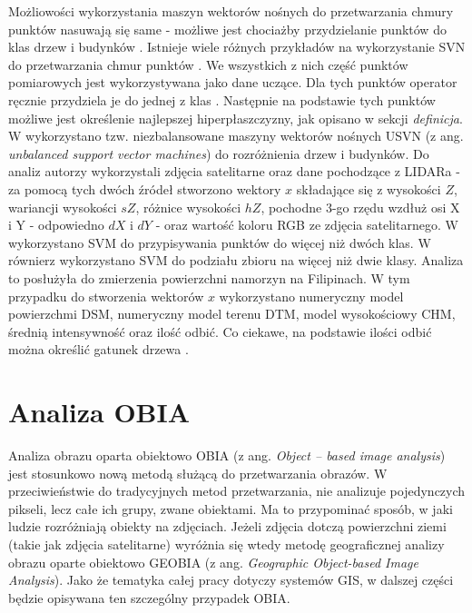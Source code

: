 Możliowości wykorzystania maszyn wektorów nośnych do przetwarzania chmury punktów nasuwają się same - możliwe jest chociażby przydzielanie punktów do klas drzew i budynków \cite{xwang2011}. Istnieje wiele 
różnych przykładów na wykorzystanie SVN do przetwarzania chmur punktów \cite{xwang2011,li2013,david2015}. We wszystkich z nich część punktów pomiarowych jest wykorzystywana jako dane uczące.
Dla tych punktów operator ręcznie przydziela je do jednej z klas \cite{xwang2011}. Następnie na podstawie tych punktów możliwe jest określenie najlepszej hiperpłaszczyzny, jak opisano w sekcji \textit{definicja}.
W \cite{xwang2011} wykorzystano tzw. niezbalansowane maszyny wektorów nośnych USVN (z ang. \textit{unbalanced support vector machines}) do rozróżnienia drzew i budynków.
Do analiz autorzy wykorzystali zdjęcia satelitarne oraz dane pochodzące z LIDARa - za pomocą tych dwóch źródeł stworzono wektory $x$
składające się z wysokości $Z$, wariancji wysokości $sZ$, różnice wysokości $hZ$,
pochodne 3-go rzędu wzdłuż osi X i Y - odpowiedno $dX$ i $dY$ - oraz wartość koloru RGB ze zdjęcia satelitarnego. 
W \cite{li2013} wykorzystano SVM do przypisywania punktów do więcej niż dwóch klas. 
W \cite{david2015} równierz wykorzystano SVM do podziału zbioru na więcej niż dwie klasy. Analiza to posłużyła do zmierzenia powierzchni namorzyn na Filipinach. 
W tym przypadku do stworzenia wektorów $x$ wykorzystano numeryczny model powierzchmi DSM, numeryczny model terenu DTM, model wysokościowy CHM, średnią intensywność oraz ilość odbić. Co ciekawe, na podstawie
ilości odbić można określić gatunek drzewa \cite{Sasaki2012}.

\section{Analiza OBIA}

Analiza obrazu oparta obiektowo OBIA (z ang. \textit{Object – based image analysis}) jest stosunkowo nową metodą \cite{burnett2003} służącą do przetwarzania obrazów. W przeciwieństwie do tradycyjnych metod przetwarzania, 
nie analizuje pojedynczych pikseli, lecz całe ich grupy, zwane obiektami. Ma to przypominać sposób, w jaki ludzie rozróżniają obiekty na zdjęciach. Jeżeli zdjęcia dotczą powierzchni ziemi (takie jak zdjęcia 
satelitarne) wyróżnia się wtedy metodę geograficznej analizy obrazu oparte obiektowo GEOBIA (z ang. \textit{Geographic Object-based Image Analysis}). Jako że tematyka całej pracy dotyczy systemów GIS,
w dalszej części będzie opisywana ten szczególny przypadek OBIA.

